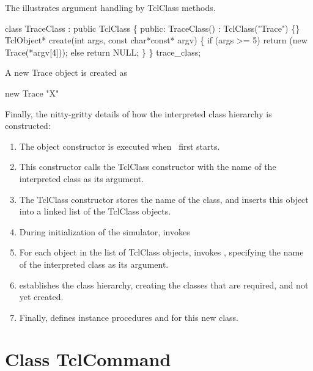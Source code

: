 The  illustrates
argument handling by TclClass methods.
\begin{program}
        class TraceClass : public TclClass \{
        public:
                TraceClass() : TclClass("Trace") \{\}
                TclObject* create(int args, const char*const* argv) \{
                        if (args >= 5)
                                return (new Trace(*argv[4]));
                        else
                                return NULL;
                \}
        \} trace_class;
\end{program}
A new Trace object is created as
\begin{program}
        new Trace "X"
\end{program}
Finally, the nitty-gritty details of how the 
interpreted class hierarchy is constructed:
\begin{enumerate}
\item The object constructor is executed when \ns\ first starts.
\item This constructor calls the TclClass constructor
  with the name of the interpreted class as its argument.
\item The TclClass constructor stores the name of the class,
  and inserts this object into a linked list of the TclClass objects.
\item During initialization of the simulator,
  invokes 
\item For each object in the list of TclClass objects,
   invokes 
  ,
  specifying the name of the interpreted class as its argument.
\item {} establishes the class hierarchy,
  creating the classes that are required, and not yet created.
\item Finally,  defines instance procedures
   and  for this new class.
\end{enumerate}

\section{Class TclCommand}
\label{sec:TclCommand}

